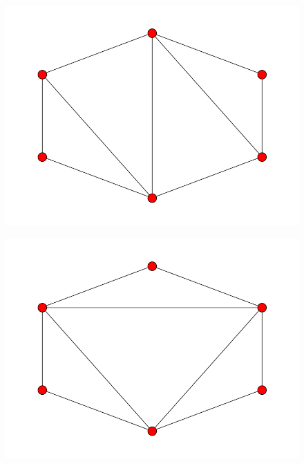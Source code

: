 \documentclass[fontsize=10pt]{article}
\begin{document}
\begin{figure}[hbtp]
\centering
\includegraphics[scale=0.5]{imgs/hexagon/hexagon_12.png}
\end{figure}

\begin{figure}[hbtp]
\centering
\includegraphics[scale=0.5]{imgs/hexagon/hexagon_13.png}
\end{figure}
\end{document}
